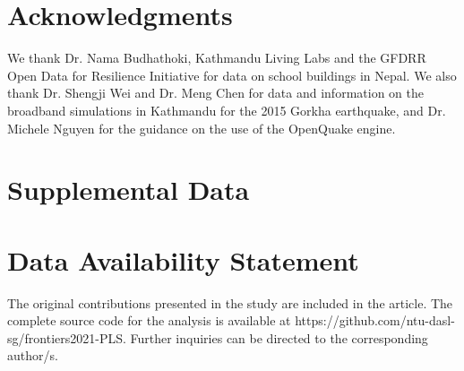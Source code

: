 \documentclass[utf8]{frontiersSCNS} %
\begin{document}
\section*{Acknowledgments}
We thank Dr. Nama Budhathoki, Kathmandu Living Labs and the GFDRR Open Data for Resilience Initiative for data on school buildings in Nepal. We also thank Dr. Shengji Wei and Dr. Meng Chen for data and information on the broadband simulations in Kathmandu for the 2015 Gorkha earthquake, and Dr. Michele Nguyen for the guidance on the use of the OpenQuake engine.


\section*{Supplemental Data}




\section*{Data Availability Statement}
The original contributions presented in the study are included in the article.  The complete source code for the analysis is available at https://github.com/ntu-dasl-sg/frontiers2021-PLS. Further inquiries can be directed to the corresponding author/s.


\end{document}
